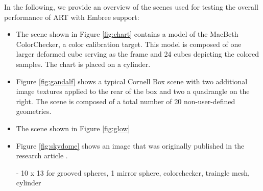 \noindent In the following, we provide an overview of the scenes used for testing the overall performance of ART with Embree support:
\begin{itemize}
	\setlength\itemsep{0.05em}
	
	\item The scene shown in Figure \ref{fig:chart} contains a model of the MacBeth ColorChecker, a color calibration target. This model is composed of one larger deformed cube serving as the frame and 24 cubes depicting the colored samples. The chart is placed on a cylinder.
	
	\item Figure \ref{fig:gandalf} shows a typical Cornell Box scene with two additional image textures applied to the rear of the box and two a quadrangle on the right. The scene is composed of a total number of 20 non-user-defined geometries.
	
	\item The scene shown in Figure \ref{fig:glow} \cite{wilkie2011physically}
	
	\item Figure \ref{fig:skydome} shows an image that was originally published in the research article  \cite{wilkie2013predicting}.
	
	- 10 x 13 for grooved spheres, 1 mirror sphere, colorchecker, traingle mesh, cylinder
	
	
\end{itemize}


